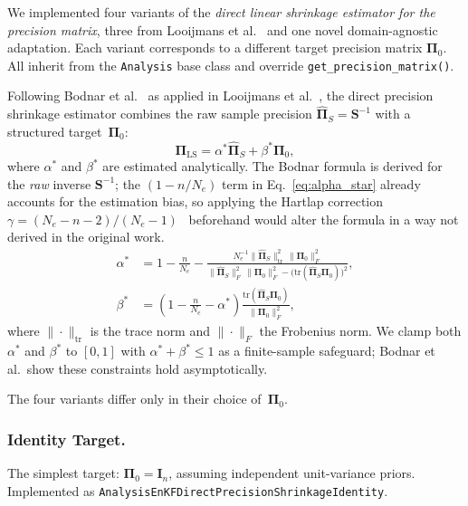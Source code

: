 We implemented four variants of the \emph{direct linear shrinkage estimator for the precision matrix}, three from Looijmans et al.~\cite{looijmans2024comparison} and one novel domain-agnostic adaptation. Each variant corresponds to a different target precision matrix $\boldsymbol{\Pi}_0$. All inherit from the \texttt{Analysis} base class and override \texttt{get\_precision\_matrix()}.

Following Bodnar et al.~\cite{bodnar2016direct} as applied in Looijmans et al.~\cite{looijmans2024comparison}, the direct precision shrinkage estimator combines the raw sample precision $\hat{\boldsymbol{\Pi}}_S = \mathbf{S}^{-1}$ with a structured target~$\boldsymbol{\Pi}_0$:
\begin{equation}
\label{eq:direct_precision}
\boldsymbol{\Pi}_{\text{LS}} = \alpha^* \hat{\boldsymbol{\Pi}}_S + \beta^* \boldsymbol{\Pi}_0,
\end{equation}
where $\alpha^*$ and $\beta^*$ are estimated analytically. The Bodnar formula is derived for the \emph{raw} inverse $\mathbf{S}^{-1}$; the $(1 - n/N_e)$ term in Eq.~\eqref{eq:alpha_star} already accounts for the estimation bias, so applying the Hartlap correction $\gamma = (N_e - n - 2)/(N_e - 1)$~\cite{hartlap2007your} beforehand would alter the formula in a way not derived in the original work.
\begin{align}
\label{eq:alpha_star}
\alpha^* &= 1 - \frac{n}{N_e} - \frac{N_e^{-1} \|\hat{\boldsymbol{\Pi}}_S\|_{\text{tr}}^2 \, \|\boldsymbol{\Pi}_0\|_F^2}{\|\hat{\boldsymbol{\Pi}}_S\|_F^2 \, \|\boldsymbol{\Pi}_0\|_F^2 - \bigl(\text{tr}(\hat{\boldsymbol{\Pi}}_S \boldsymbol{\Pi}_0)\bigr)^2}, \\
\label{eq:beta_star}
\beta^* &= \left(1 - \frac{n}{N_e} - \alpha^*\right) \frac{\text{tr}(\hat{\boldsymbol{\Pi}}_S \boldsymbol{\Pi}_0)}{\|\boldsymbol{\Pi}_0\|_F^2},
\end{align}
where $\|\cdot\|_{\text{tr}}$ is the trace norm and $\|\cdot\|_F$ the Frobenius norm. We clamp both $\alpha^*$ and $\beta^*$ to $[0,1]$ with $\alpha^* + \beta^* \leq 1$ as a finite-sample safeguard; Bodnar et al.\ show these constraints hold asymptotically.

The four variants differ only in their choice of~$\boldsymbol{\Pi}_0$.

\subsubsection{Identity Target.}

The simplest target: $\boldsymbol{\Pi}_0 = \mathbf{I}_n$, assuming independent unit-variance priors. Implemented as \texttt{Analysis\-EnKF\-Direct\-Precision\-Shrinkage\-Identity}.

